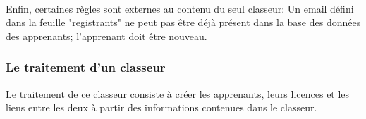 \paragraph{}
Enfin, certaines règles sont externes au contenu du seul classeur:
Un email défini dans la feuille "registrants" ne peut pas être déjà présent dans la base des données des apprenants; l'apprenant doit être nouveau.

\subsubsection{Le traitement d'un classeur}
\label{subsubsec:spreadsheet-processing-case}
Le traitement de ce classeur consiste à créer les apprenants, leurs licences et les liens entre les deux à partir des informations contenues dans le classeur.
